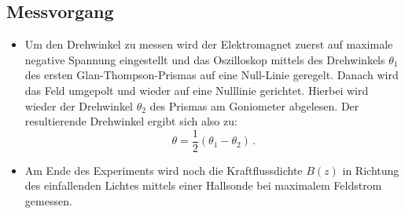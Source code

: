 \subsection{Messvorgang}
\begin{itemize}
	\item Um den Drehwinkel zu messen wird der Elektromagnet zuerst auf maximale negative
		Spannung eingestellt und das Oszilloskop mittels des Drehwinkels $\theta_1$ 
		des ersten Glan-Thompson-Prismas auf eine Null-Linie geregelt. Danach wird das
		Feld umgepolt und wieder auf eine Nulllinie gerichtet. Hierbei wird wieder der
		Drehwinkel $\theta_2$ des Prismas am Goniometer abgelesen. Der resultierende
		Drehwinkel ergibt sich also zu:
		\begin{equation*}
			\theta = \frac{1}{2}(\theta_1-\theta_2) \, \mathrm{.}
		\end{equation*}
	\item Am Ende des Experiments wird noch die Kraftflussdichte $B(z)$ in Richtung des
		einfallenden Lichtes mittels einer Hallsonde bei maximalem Feldstrom gemessen.
\end{itemize}
